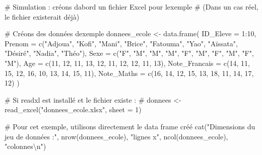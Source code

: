 \documentclass[
  french,
  11pt,
  a4paper,
]{article}
\newenvironment{Shaded}{}{}
\newcommand{\AttributeTok}[1]{\textcolor[rgb]{0.84,0.23,0.29}{#1}}
\newcommand{\CommentTok}[1]{\textcolor[rgb]{0.42,0.45,0.49}{#1}}
\newcommand{\DecValTok}[1]{\textcolor[rgb]{0.00,0.36,0.77}{#1}}
\newcommand{\FunctionTok}[1]{\textcolor[rgb]{0.44,0.26,0.76}{#1}}
\newcommand{\NormalTok}[1]{\textcolor[rgb]{0.14,0.16,0.18}{#1}}
\newcommand{\OtherTok}[1]{\textcolor[rgb]{0.44,0.26,0.76}{#1}}
\newcommand{\SpecialCharTok}[1]{\textcolor[rgb]{0.00,0.36,0.77}{#1}}
\newcommand{\StringTok}[1]{\textcolor[rgb]{0.01,0.18,0.38}{#1}}
\begin{document}
\begin{Shaded}
\begin{Highlighting}[]
\CommentTok{\# Simulation : créons d\textquotesingle{}abord un fichier Excel pour l\textquotesingle{}exemple}
\CommentTok{\# (Dans un cas réel, le fichier existerait déjà)}

\CommentTok{\# Créons des données d\textquotesingle{}exemple}
\NormalTok{donnees\_ecole }\OtherTok{\textless{}{-}} \FunctionTok{data.frame}\NormalTok{(}
  \AttributeTok{ID\_Eleve =} \DecValTok{1}\SpecialCharTok{:}\DecValTok{10}\NormalTok{,}
  \AttributeTok{Prenom =} \FunctionTok{c}\NormalTok{(}\StringTok{"Adjoua"}\NormalTok{, }\StringTok{"Kofi"}\NormalTok{, }\StringTok{"Mani"}\NormalTok{, }\StringTok{"Brice"}\NormalTok{, }\StringTok{"Fatouma"}\NormalTok{,}
             \StringTok{"Yao"}\NormalTok{, }\StringTok{"Aïssata"}\NormalTok{, }\StringTok{"Désiré"}\NormalTok{, }\StringTok{"Nadia"}\NormalTok{, }\StringTok{"Théo"}\NormalTok{),}
  \AttributeTok{Sexe =} \FunctionTok{c}\NormalTok{(}\StringTok{"F"}\NormalTok{, }\StringTok{"M"}\NormalTok{, }\StringTok{"M"}\NormalTok{, }\StringTok{"M"}\NormalTok{, }\StringTok{"F"}\NormalTok{, }\StringTok{"M"}\NormalTok{, }\StringTok{"F"}\NormalTok{, }\StringTok{"M"}\NormalTok{, }\StringTok{"F"}\NormalTok{, }\StringTok{"M"}\NormalTok{),}
  \AttributeTok{Age =} \FunctionTok{c}\NormalTok{(}\DecValTok{11}\NormalTok{, }\DecValTok{12}\NormalTok{, }\DecValTok{11}\NormalTok{, }\DecValTok{13}\NormalTok{, }\DecValTok{12}\NormalTok{, }\DecValTok{11}\NormalTok{, }\DecValTok{12}\NormalTok{, }\DecValTok{12}\NormalTok{, }\DecValTok{11}\NormalTok{, }\DecValTok{13}\NormalTok{),}
  \AttributeTok{Note\_Francais =} \FunctionTok{c}\NormalTok{(}\DecValTok{14}\NormalTok{, }\DecValTok{11}\NormalTok{, }\DecValTok{15}\NormalTok{, }\DecValTok{12}\NormalTok{, }\DecValTok{16}\NormalTok{, }\DecValTok{10}\NormalTok{, }\DecValTok{13}\NormalTok{, }\DecValTok{14}\NormalTok{, }\DecValTok{15}\NormalTok{, }\DecValTok{11}\NormalTok{),}
  \AttributeTok{Note\_Maths =} \FunctionTok{c}\NormalTok{(}\DecValTok{16}\NormalTok{, }\DecValTok{14}\NormalTok{, }\DecValTok{12}\NormalTok{, }\DecValTok{15}\NormalTok{, }\DecValTok{13}\NormalTok{, }\DecValTok{18}\NormalTok{, }\DecValTok{11}\NormalTok{, }\DecValTok{14}\NormalTok{, }\DecValTok{17}\NormalTok{, }\DecValTok{12}\NormalTok{)}
\NormalTok{)}

\CommentTok{\# Si readxl est installé et le fichier existe :}
\CommentTok{\# donnees \textless{}{-} read\_excel("donnees\_ecole.xlsx", sheet = 1)}

\CommentTok{\# Pour cet exemple, utilisons directement le data frame créé}
\FunctionTok{cat}\NormalTok{(}\StringTok{"Dimensions du jeu de données :"}\NormalTok{, }\FunctionTok{nrow}\NormalTok{(donnees\_ecole), }\StringTok{"lignes x"}\NormalTok{, }
    \FunctionTok{ncol}\NormalTok{(donnees\_ecole), }\StringTok{"colonnes}\SpecialCharTok{\textbackslash{}n}\StringTok{"}\NormalTok{)}
\end{Highlighting}
\end{Shaded}
\end{document}
